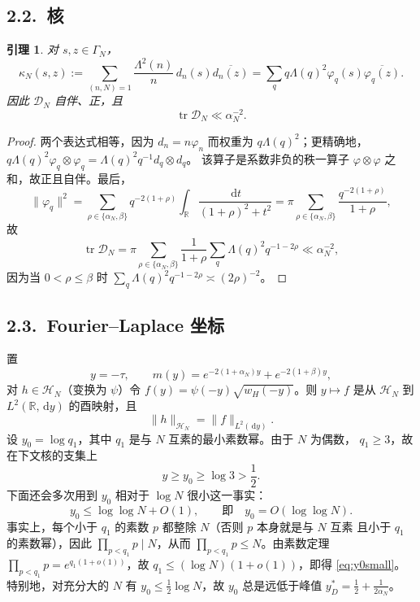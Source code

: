 \documentclass[12pt,a4paper]{amsart}
\numberwithin{equation}{section}
\theoremstyle{plain}
\newtheorem{lemma}[theorem]{引理}
\theoremstyle{definition}
\newcommand{\dd}{\,\mathrm{d}}
\begin{document}
\subsection*{2.2.\ 核}

\begin{lemma}\label{lem:kernel}
对 $s,z\in\Gamma_N$，
\begin{equation}\label{eq:kernel}
 \kappa_N(s,z):=\sum_{(n,N)=1}\frac{\Lambda^2(n)}{n}\,d_n(s)\overline{d_n(z)}
 =\sum_q q\Lambda(q)^2\varphi_q(s)\overline{\varphi_q(z)} .
\end{equation}
因此 $\mathcal D_N$ 自伴、正，且
\begin{equation}\label{eq:trace}
 \operatorname{tr}\mathcal D_N\ll\alpha_N^{-2}.
\end{equation}
\end{lemma}

\begin{proof}
两个表达式相等，因为 $d_n=n\varphi_n$ 而权重为 $q\Lambda(q)^2$；更精确地，
$q\Lambda(q)^2\varphi_q\otimes\varphi_q=\Lambda(q)^2q^{-1}d_q\otimes d_q$。
该算子是系数非负的秩一算子 $\varphi\otimes\varphi$ 之和，故正且自伴。最后，
\[
 \|\varphi_q\|^2=\sum_{\rho\in\{\alpha_N,\beta\}}q^{-2(1+\rho)}
 \int_{\mathbb R}\frac{\dd t}{(1+\rho)^2+t^2}
 =\pi\sum_{\rho\in\{\alpha_N,\beta\}}\frac{q^{-2(1+\rho)}}{1+\rho},
\]
故
\[
 \operatorname{tr}\mathcal D_N
 =\pi\sum_{\rho\in\{\alpha_N,\beta\}}\frac1{1+\rho}
 \sum_q\Lambda(q)^2q^{-1-2\rho}\ll\alpha_N^{-2},
\]
因为当 $0<\rho\le\beta$ 时 $\sum_q\Lambda(q)^2q^{-1-2\rho}\asymp(2\rho)^{-2}$。
\end{proof}

\subsection*{2.3.\ Fourier--Laplace 坐标}

置
\begin{equation}\label{eq:m}
 y=-\tau,\qquad m(y)=e^{-2(1+\alpha_N)y}+e^{-2(1+\beta)y},
\end{equation}
对 $h\in\mathcal H_N$（变换为 $\psi$）令 $f(y)=\psi(-y)\sqrt{w_H(-y)}$。则
$y\mapsto f$ 是从 $\mathcal H_N$ 到 $L^2(\mathbb R,\dd y)$ 的酉映射，且
\begin{equation}\label{eq:unit}
 \|h\|_{\mathcal H_N}=\|f\|_{L^2(\dd y)} .
\end{equation}
设 $y_0=\log q_1$，其中 $q_1$ 是与 $N$ 互素的最小素数幂。由于 $N$ 为偶数，
$q_1\ge3$，故在下文核的支集上
\begin{equation}\label{eq:y0}
 y\ge y_0\ge\log3>\frac12 .
\end{equation}
下面还会多次用到 $y_0$ 相对于 $\log N$ 很小这一事实：
\begin{equation}\label{eq:y0small}
 y_0\le\log\log N+O(1),\qquad\text{即}\quad y_0=O(\log\log N).
\end{equation}
事实上，每个小于 $q_1$ 的素数 $p$ 都整除 $N$（否则 $p$ 本身就是与 $N$ 互素
且小于 $q_1$ 的素数幂），因此 $\prod_{p<q_1}p\mid N$，从而
$\prod_{p<q_1}p\le N$。由素数定理 $\prod_{p<q_1}p=e^{q_1(1+o(1))}$，故
$q_1\le(\log N)(1+o(1))$，即得 \eqref{eq:y0small}。特别地，对充分大的 $N$ 有
$y_0\le\frac12\log N$，故 $y_0$ 总是远低于峰值
$y_D^*=\frac12+\frac1{2\alpha_N}$。
\end{document}
